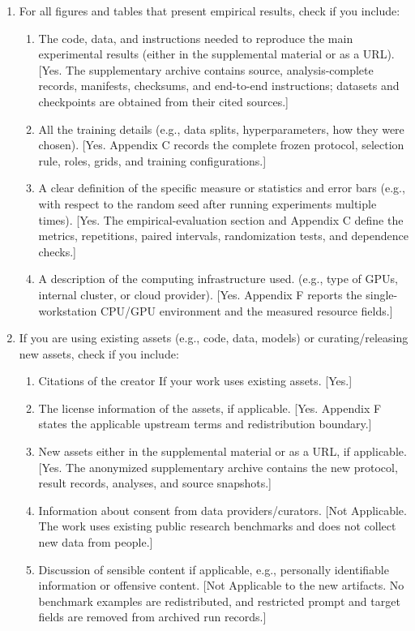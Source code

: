 \begin{enumerate}
  \item For all figures and tables that present empirical results, check if you
  include:
  \begin{enumerate}
    \item The code, data, and instructions needed to reproduce the main
    experimental results (either in the supplemental material or as a URL).
    [Yes. The supplementary archive contains source, analysis-complete records,
    manifests, checksums, and end-to-end instructions; datasets and checkpoints
    are obtained from their cited sources.]
    \item All the training details (e.g., data splits, hyperparameters, how they
    were chosen). [Yes. Appendix C records the complete frozen protocol,
    selection rule, roles, grids, and training configurations.]
    \item A clear definition of the specific measure or statistics and error
    bars (e.g., with respect to the random seed after running experiments
    multiple times). [Yes. The empirical-evaluation section and Appendix C define the metrics,
    repetitions, paired intervals, randomization tests, and dependence checks.]
    \item A description of the computing infrastructure used. (e.g., type of
    GPUs, internal cluster, or cloud provider). [Yes. Appendix F reports the
    single-workstation CPU/GPU environment and the measured resource fields.]
  \end{enumerate}

  \item If you are using existing assets (e.g., code, data, models) or
  curating/releasing new assets, check if you include:
  \begin{enumerate}
    \item Citations of the creator If your work uses existing assets. [Yes.]
    \item The license information of the assets, if applicable. [Yes. Appendix
    F states the applicable upstream terms and redistribution boundary.]
    \item New assets either in the supplemental material or as a URL, if
    applicable. [Yes. The anonymized supplementary archive contains the new
    protocol, result records, analyses, and source snapshots.]
    \item Information about consent from data providers/curators. [Not
    Applicable. The work uses existing public research benchmarks and does not
    collect new data from people.]
    \item Discussion of sensible content if applicable, e.g., personally
    identifiable information or offensive content. [Not Applicable to the new
    artifacts. No benchmark examples are redistributed, and restricted prompt
    and target fields are removed from archived run records.]
  \end{enumerate}


\end{enumerate}
